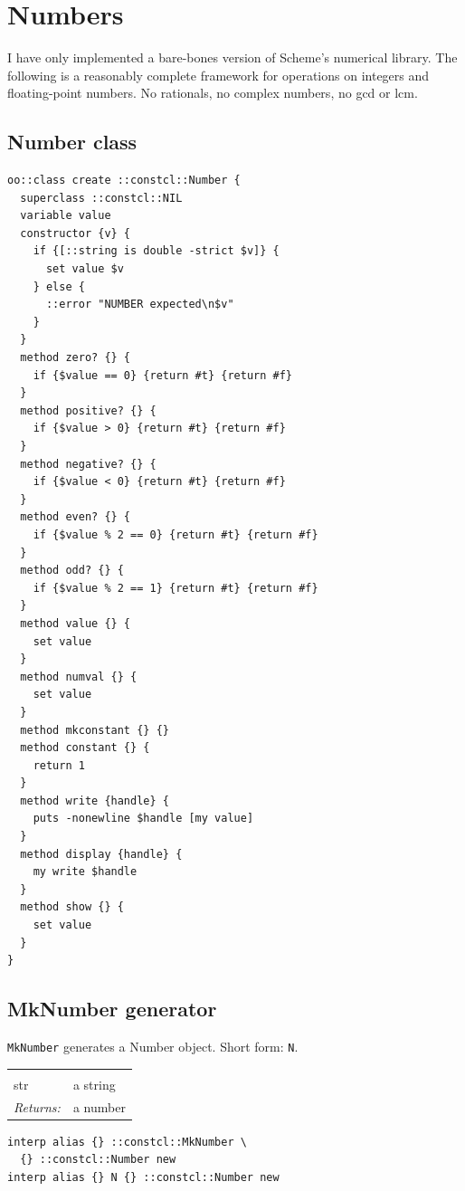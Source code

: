 \documentclass[twoside,9pt]{report}
\begin{document}
\section{Numbers}
\label{numbers}


I have only implemented a bare-bones version of Scheme's numerical library. The following is a reasonably complete framework for operations on integers and floating-point numbers. No rationals, no complex numbers, no gcd or lcm.

\subsection{Number class}
\label{number-class}
\begin{lstlisting}
oo::class create ::constcl::Number {
  superclass ::constcl::NIL
  variable value
  constructor {v} {
    if {[::string is double -strict $v]} {
      set value $v
    } else {
      ::error "NUMBER expected\n$v"
    }
  }
  method zero? {} {
    if {$value == 0} {return #t} {return #f}
  }
  method positive? {} {
    if {$value > 0} {return #t} {return #f}
  }
  method negative? {} {
    if {$value < 0} {return #t} {return #f}
  }
  method even? {} {
    if {$value % 2 == 0} {return #t} {return #f}
  }
  method odd? {} {
    if {$value % 2 == 1} {return #t} {return #f}
  }
  method value {} {
    set value
  }
  method numval {} {
    set value
  }
  method mkconstant {} {}
  method constant {} {
    return 1
  }
  method write {handle} {
    puts -nonewline $handle [my value]
  }
  method display {handle} {
    my write $handle
  }
  method show {} {
    set value
  }
}
\end{lstlisting}
\subsection{MkNumber generator}
\label{mknumber-generator}


\texttt{MkNumber} generates a Number object. Short form: \texttt{N}.

\noindent\begin{tabular}{ |p{1.9cm} p{8cm}| }
\hline
\rowcolor[HTML]{CCCCCC} \multicolumn{2}{|l|}{\bf MkNumber (internal)} \\
str & a string \\
\textit{Returns:} & a number \\
\hline
\end{tabular}
\begin{lstlisting}
interp alias {} ::constcl::MkNumber \
  {} ::constcl::Number new
interp alias {} N {} ::constcl::Number new
\end{lstlisting}
\end{document}
